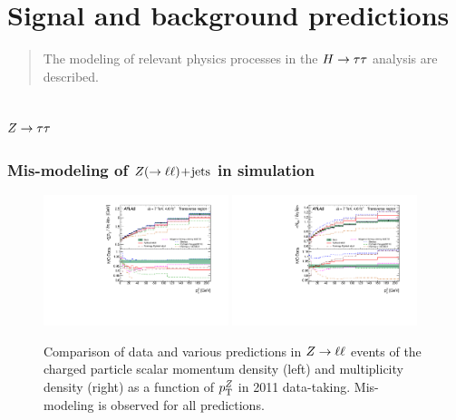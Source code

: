 \chapter[Signal and background predictions][Signal and background predictions]{Signal and background predictions}
\label{chap:backgrounds}

\begin{quote}
The modeling of relevant physics processes in the $H\rightarrow\tau\tau$ analysis are described.
\end{quote}

\section{$Z\rightarrow\tau\tau$}
\label{sec:backgrounds-ztautau}

\subsection{Mis-modeling of $Z (\rightarrow \ell\ell)\!+\!\text{jets}$ in simulation}

\begin{figure}[tp]
  \centering
  \includegraphics[width=0.48\textwidth]{figures/STDM-2011-42/fig_14b}
  \includegraphics[width=0.48\textwidth]{figures/STDM-2011-42/fig_17b}
  \caption{Comparison of data and various predictions in $Z \rightarrow \ell\ell$ events of the charged particle scalar momentum density (left) and multiplicity density (right) as a function of $p_{\mathrm{T}}^Z$ in 2011 data-taking. Mis-modeling is observed for all predictions.}
  \label{fig:backgrounds-zue}
\end{figure}


